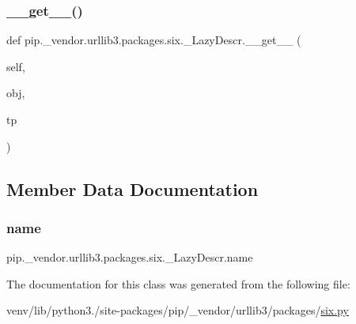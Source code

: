 \subsubsection{\texorpdfstring{\+\_\+\+\_\+get\+\_\+\+\_\+()}{\_\_get\_\_()}}
{\footnotesize\ttfamily def pip.\+\_\+vendor.\+urllib3.\+packages.\+six.\+\_\+\+Lazy\+Descr.\+\_\+\+\_\+get\+\_\+\+\_\+ (\begin{DoxyParamCaption}\item[{}]{self,  }\item[{}]{obj,  }\item[{}]{tp }\end{DoxyParamCaption})}



\subsection{Member Data Documentation}
\mbox{\label{classpip_1_1__vendor_1_1urllib3_1_1packages_1_1six_1_1__LazyDescr_ab59648d566d3274f298247937875a268}} 
\subsubsection{\texorpdfstring{name}{name}}
{\footnotesize\ttfamily pip.\+\_\+vendor.\+urllib3.\+packages.\+six.\+\_\+\+Lazy\+Descr.\+name}



The documentation for this class was generated from the following file\+:\begin{DoxyCompactItemize}
\item 
venv/lib/python3./site-\/packages/pip/\+\_\+vendor/urllib3/packages/\hyperlink{pip_2__vendor_2urllib3_2packages_2six_8py}{six.\+py}\end{DoxyCompactItemize}
